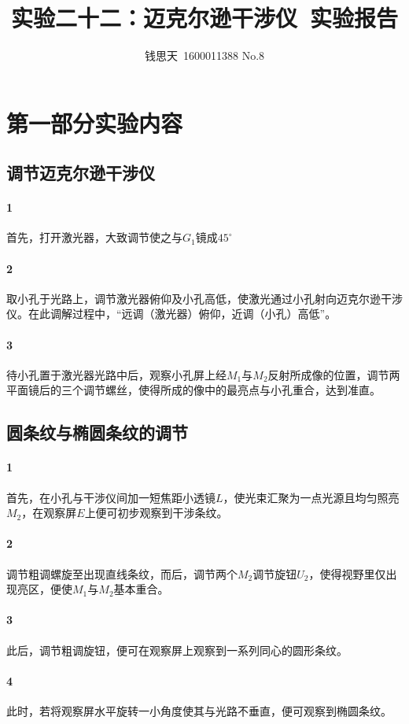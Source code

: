 \documentclass{ctexart}
\author{钱思天\ 1600011388 No.8}
\title{实验二十二：迈克尔逊干涉仪\ 实验报告}
\begin{document}
      \maketitle
      \section{第一部分实验内容}
      \subsection{调节迈克尔逊干涉仪}
      \paragraph{1}首先，打开激光器，大致调节使之与$G_1$镜成$45^\circ$
      \paragraph{2}取小孔于光路上，调节激光器俯仰及小孔高低，使激光通过小孔射向迈克尔逊干涉仪。在此调解过程中，“远调（激光器）俯仰，近调（小孔）高低”。
      \paragraph{3}待小孔置于激光器光路中后，观察小孔屏上经$M_1$与$M_2$反射所成像的位置，调节两平面镜后的三个调节螺丝，使得所成的像中的最亮点与小孔重合，达到准直。
      \subsection{圆条纹与椭圆条纹的调节}
      \paragraph{1}首先，在小孔与干涉仪间加一短焦距小透镜$L$，使光束汇聚为一点光源且均匀照亮$M_2$，在观察屏$E$上便可初步观察到干涉条纹。
      \paragraph{2}调节粗调螺旋至出现直线条纹，而后，调节两个$M_2$调节旋钮$U_2$，使得视野里仅出现亮区，便使$M_1$与$M_2$基本重合。
      \paragraph{3}此后，调节粗调旋钮，便可在观察屏上观察到一系列同心的圆形条纹。
      \paragraph{4}此时，若将观察屏水平旋转一小角度使其与光路不垂直，便可观察到椭圆条纹。
\end{document}
